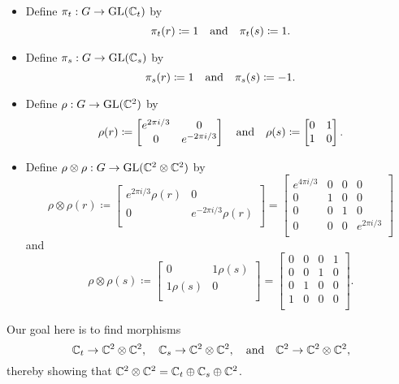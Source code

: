 \begin{itemize}
    \item Define $\pi_t:G\to\operatorname{GL}(\mathbb{C}_t)$ by
    \[
    \pi_t(r) \coloneq 1 \quad\text{and}\quad 
    \pi_t(s) \coloneq 1.
    \]

    \item Define $\pi_s:G\to\operatorname{GL}(\mathbb{C}_s)$ by
    \[
    \pi_s(r) \coloneq 1 \quad\text{and}\quad 
    \pi_s(s) \coloneq -1.
    \]
    
    \item Define $\rho:G\to\operatorname{GL}(\mathbb{C}^2)$ by
    \[
    \rho(r) \coloneq \begin{bmatrix}
        e^{2\pi i/3} & 0\\
        0 & e^{-2\pi i/3} \\
    \end{bmatrix} \quad\text{and}\quad 
    \rho(s) \coloneq \begin{bmatrix}
        0 & 1 \\
        1 & 0 \\
    \end{bmatrix}.
    \]

    \item Define $\rho\otimes\rho:G\to\operatorname{GL}(\mathbb{C}^2\otimes\mathbb{C}^2)$ by
    \[
    \rho\otimes\rho(r) \coloneq \begin{bmatrix}
        e^{2\pi i/3} \rho(r) & 0\\
        0 & e^{-2\pi i/3} \rho(r) \\
    \end{bmatrix} = \begin{bmatrix}
    e^{4\pi i/3} & 0 & 0 & 0 \\
    0 & 1 & 0 & 0 \\
    0 & 0 & 1 & 0 \\
    0 & 0 & 0 & e^{2\pi i/3} \\
    \end{bmatrix}
    \]
    and 
    \[
    \rho\otimes\rho(s) \coloneq \begin{bmatrix}
        0 & 1 \rho(s) \\
        1\rho(s) & 0 \\
    \end{bmatrix} = \begin{bmatrix}
    0 & 0 & 0 & 1 \\
    0 & 0 & 1 & 0 \\
    0 & 1 & 0 & 0 \\
    1 & 0 & 0 & 0 \\
    \end{bmatrix}.
    \]
\end{itemize}

Our goal here is to find morphisms 
\[
    \mathbb{C}_t \to\mathbb{C}^2\otimes\mathbb{C}^2,\quad \mathbb{C}_s\to \mathbb{C}^2\otimes\mathbb{C}^2,\quad\text{and}\quad \mathbb{C}^2\to \mathbb{C}^2\otimes\mathbb{C}^2,
\]
thereby showing that $\mathbb{C}^2\otimes\mathbb{C}^2 = \mathbb{C}_t \oplus \mathbb{C}_s \oplus \mathbb{C}^2$.